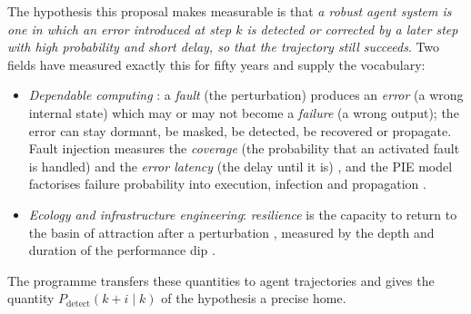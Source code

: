 \documentclass[10pt,a4paper]{article}
\begin{document}
The hypothesis this proposal makes measurable is that \emph{a robust agent system is one in which an error introduced at step $k$ is detected or corrected by a later step with high probability and short delay, so that the trajectory still succeeds}. Two fields have measured exactly this for fifty years and supply the vocabulary:
\begin{itemize}[leftmargin=1.1em]
\item \emph{Dependable computing} \cite{avizienis2004dependability}: a \emph{fault} (the perturbation) produces an \emph{error} (a wrong internal state) which may or may not become a \emph{failure} (a wrong output); the error can stay dormant, be masked, be detected, be recovered or propagate. Fault injection measures the \emph{coverage} (the probability that an activated fault is handled) and the \emph{error latency} (the delay until it is) \cite{arlat1990fault,powell1995coverage}, and the PIE model factorises failure probability into execution, infection and propagation \cite{voas1992pie}.
\item \emph{Ecology and infrastructure engineering}: \emph{resilience} is the capacity to return to the basin of attraction after a perturbation \cite{holling1973resilience}, measured by the depth and duration of the performance dip \cite{bruneau2003resilience}.
\end{itemize}
The programme transfers these quantities to agent trajectories and gives the quantity $P_{\mathrm{detect}}(k{+}i\mid k)$ of the hypothesis a precise home.
\end{document}
